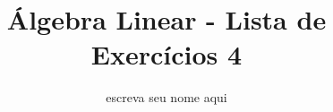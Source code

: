 \documentclass[leqno]{article}
\numberwithin{equation}{section}
\begin{document}
\newtheorem*{prop*}{Proposição}
\newtheorem{lema}[teo]{Lemma} \newtheorem*{lema*}{Lema}
\newtheorem*{cor*}{Corolário}

\theoremstyle{definition}
\newtheorem{defi}[teo]{Definição} \newtheorem*{defi*}{Definição}
\newtheorem{exem}[teo]{Exemplo} \newtheorem*{exem*}{Exemplo}
\newtheorem{obs}[teo]{Observação} \newtheorem*{obs*}{Observação}
\newtheorem*{hipo}{Hipóteses}
\newtheorem*{nota}{Notação}

\newcommand{\ds}{\displaystyle} \newcommand{\nl}{\newline}
\newcommand{\eps}{\varepsilon} \newcommand{\ssty}{\scriptstyle}
\newcommand{\bE}{\mathbb{E}}
\newcommand{\cB}{\mathcal{B}}
\newcommand{\cF}{\mathcal{F}}
\newcommand{\cA}{\mathcal{A}}
\newcommand{\cM}{\mathcal{M}}
\newcommand{\cD}{\mathcal{D}}
\newcommand{\cN}{\mathcal{N}}
\newcommand{\cL}{\mathcal{L}}
\newcommand{\cLN}{\mathcal{LN}}
\newcommand{\bP}{\mathbb{P}}
\newcommand{\bQ}{\mathbb{Q}}
\newcommand{\bN}{\mathbb{N}}
\newcommand{\R}{\mathbb{R}}
\newcommand{\bZ}{\mathbb{Z}}

\DeclarePairedDelimiter{\dotprod}{\langle}{\rangle} 
\newcommand{\defeq}{\vcentcolon=}
\newcommand{\bfw}{\mathbf{w}}
\newcommand{\bfv}{\mathbf{v}}
\newcommand{\bfu}{\mathbf{u}}

\newcommand{\bvecc}[2]{%
    \begin{bmatrix} #1 \\ #2  \end{bmatrix}
}
\newcommand{\bveccc}[3]{%
    \begin{bmatrix} #1 \\ #2 \\ #3  \end{bmatrix}
}

\newenvironment{sol}
{
    \vspace{4mm}
    \noindent\textbf{Resolução:}
    \strut\newline
    \smallskip
    \hspace{-3.5mm}
}
{} 

\title{Álgebra Linear - Lista de Exercícios 4}

\author{escreva seu nome aqui}

\date{}

\maketitle
\end{document}
